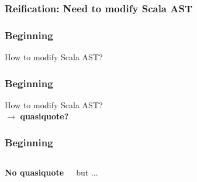 \documentclass{beamer}
\begin{document}

\begin{frame}
\frametitle{Reification: Need to modify Scala AST}



\end{frame}


\begin{frame}
\frametitle{Beginning}

How to modify Scala AST?\\

\end{frame}


\begin{frame}
\frametitle{Beginning}

How to modify Scala AST?\\
$\rightarrow $ \textbf{quasiquote?}\\

\end{frame}



\begin{frame}
\frametitle{Beginning}
\begin{columns}[c] %

\textbf{No quasiquote}

but ...
\end{columns}
\end{frame}

\end{document}
